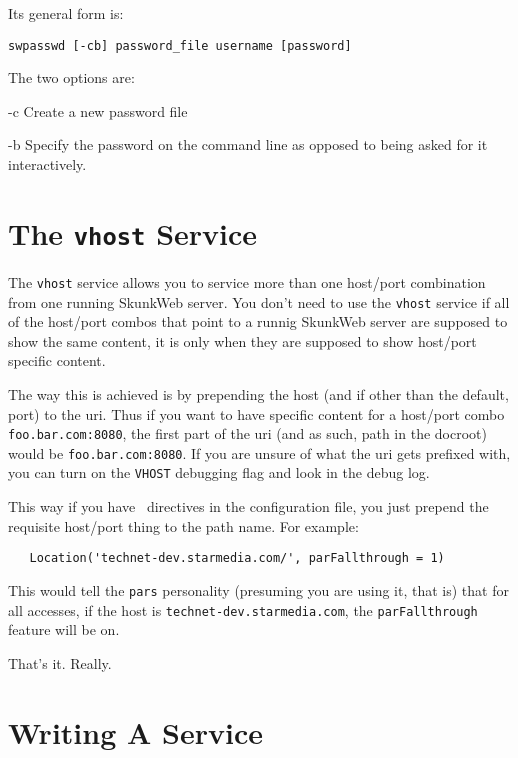 \documentclass{manual}
\begin{document}
Its general form is:
\begin{verbatim}
swpasswd [-cb] password_file username [password]
\end{verbatim}

The two options are:
\begin{argdesc}
\item[-c] Create a new password file
\item[-b] Specify the password on the command line as opposed to being
asked for it interactively.
\end{argdesc}



\chapter{The \texttt{vhost} Service}

The \texttt{vhost} service allows you to service more than one
host/port combination from one running SkunkWeb server.  You don't
need to use the \texttt{vhost} service if all of the host/port combos
that point to a runnig SkunkWeb server are supposed to show the same
content, it is only when they are supposed to show host/port specific
content.

The way this is achieved is by prepending the host (and if other than
the default, port) to the uri.  Thus if you want to have specific
content for a host/port combo \verb!foo.bar.com:8080!, the first part
of the uri (and as such, path in the docroot) would be
\verb!foo.bar.com:8080!.  If you are unsure of what the uri gets
prefixed with, you can turn on the \texttt{VHOST} debugging flag and
look in the debug log.

This way if you have \Location\ directives in the configuration file,
you just prepend the requisite host/port thing to the path name.  For
example:
\begin{verbatim}
   Location('technet-dev.starmedia.com/', parFallthrough = 1)
\end{verbatim}
This would tell the \texttt{pars} personality (presuming you are using
it, that is) that for all accesses, if the host is
\verb!technet-dev.starmedia.com!, the \texttt{parFallthrough} feature
will be on.

That's it.  Really.


\chapter{Writing A Service}
\end{document}

